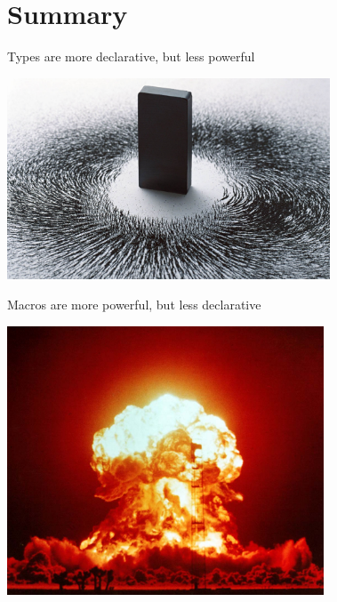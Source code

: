 \documentclass{beamer}
\begin{document}
  \section{Summary}

\begin{frame}[fragile]{Types are more declarative, but less powerful}
  \begin{center}
    \includegraphics[height=6cm]{img/magnet.jpg}
  \end{center}
\end{frame}

\begin{frame}[fragile]{Macros are more powerful, but less declarative}
  \begin{center}
    \includegraphics[height=8cm]{img/boom.jpg}
  \end{center}
\end{frame}
\end{document}

